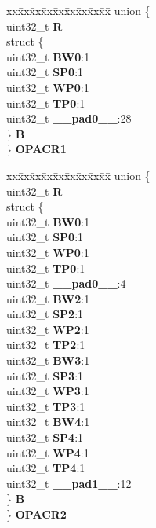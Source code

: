 \begin{DoxyCompactItemize}
\begin{tabbing}
\end{tabbing}\item 
\mbox{\label{structPBRIDGE__A__tag_a1bfb1ddeaff8697c30df56173cafd0b4}} 
\begin{tabbing}
xx\=xx\=xx\=xx\=xx\=xx\=xx\=xx\=xx\=\kill
union \{\\
\>uint32\_t {\bfseries R}\\
\>struct \{\\
\>\>uint32\_t {\bfseries BW0}:1\\
\>\>uint32\_t {\bfseries SP0}:1\\
\>\>uint32\_t {\bfseries WP0}:1\\
\>\>uint32\_t {\bfseries TP0}:1\\
\>\>uint32\_t {\bfseries \_\_pad0\_\_}:28\\
\>\} {\bfseries B}\\
\} {\bfseries OPACR1}\\

\end{tabbing}\item 
\mbox{\label{structPBRIDGE__A__tag_aba531c9252b8ec8043343fafe4b0ff76}} 
\begin{tabbing}
xx\=xx\=xx\=xx\=xx\=xx\=xx\=xx\=xx\=\kill
union \{\\
\>uint32\_t {\bfseries R}\\
\>struct \{\\
\>\>uint32\_t {\bfseries BW0}:1\\
\>\>uint32\_t {\bfseries SP0}:1\\
\>\>uint32\_t {\bfseries WP0}:1\\
\>\>uint32\_t {\bfseries TP0}:1\\
\>\>uint32\_t {\bfseries \_\_pad0\_\_}:4\\
\>\>uint32\_t {\bfseries BW2}:1\\
\>\>uint32\_t {\bfseries SP2}:1\\
\>\>uint32\_t {\bfseries WP2}:1\\
\>\>uint32\_t {\bfseries TP2}:1\\
\>\>uint32\_t {\bfseries BW3}:1\\
\>\>uint32\_t {\bfseries SP3}:1\\
\>\>uint32\_t {\bfseries WP3}:1\\
\>\>uint32\_t {\bfseries TP3}:1\\
\>\>uint32\_t {\bfseries BW4}:1\\
\>\>uint32\_t {\bfseries SP4}:1\\
\>\>uint32\_t {\bfseries WP4}:1\\
\>\>uint32\_t {\bfseries TP4}:1\\
\>\>uint32\_t {\bfseries \_\_pad1\_\_}:12\\
\>\} {\bfseries B}\\
\} {\bfseries OPACR2}\\


\end{tabbing}
\end{DoxyCompactItemize}
